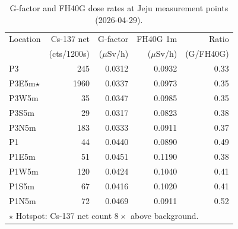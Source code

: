 \begin{table}[htbp]
\centering
\caption{G-factor and FH40G dose rates at Jeju measurement points (2026-04-29).}
\label{tab:results}
\begin{tabular}{lrrrr}
\hline
Location & Cs-137 net & G-factor & FH40G 1m & Ratio \\
         & (cts/1200s)& ($\mu$Sv/h) & ($\mu$Sv/h) & (G/FH40G) \\
\hline
P3 & 245 & 0.0312 & 0.0932 & 0.33 \\
P3E5m$\star$ & 1960 & 0.0337 & 0.0973 & 0.35 \\
P3W5m & 35 & 0.0347 & 0.0985 & 0.35 \\
P3S5m & 29 & 0.0317 & 0.0823 & 0.38 \\
P3N5m & 183 & 0.0333 & 0.0911 & 0.37 \\
P1 & 44 & 0.0440 & 0.0890 & 0.49 \\
P1E5m & 51 & 0.0451 & 0.1190 & 0.38 \\
P1W5m & 120 & 0.0424 & 0.1040 & 0.41 \\
P1S5m & 67 & 0.0416 & 0.1020 & 0.41 \\
P1N5m & 72 & 0.0469 & 0.0911 & 0.52 \\
\hline
\multicolumn{5}{l}{$\star$ Hotspot: Cs-137 net count $8\times$ above background.}\\
\end{tabular}
\end{table}
